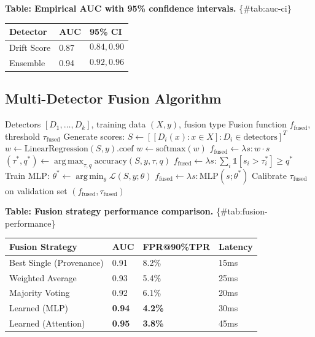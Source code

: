 \documentclass[
]{article}
\newcounter{none} %
\DeclareMathOperator*{\argmax}{arg\,max}
\DeclareMathOperator*{\argmin}{arg\,min}
\begin{document}
\textbf{Table: Empirical AUC with 95\% confidence intervals.}
\{\#tab:auc-ci\}

{\def\LTcaptype{none} %
\begin{longtable}[]{@{}lll@{}}
\toprule\noalign{}
Detector & AUC & 95\% CI \\
\midrule\noalign{}
\endhead
\bottomrule\noalign{}
\endlastfoot
Drift Score & 0.87 & \[0.84, 0.90\] \\
Ensemble & 0.94 & \[0.92, 0.96\] \\
\end{longtable}
}

\subsection{Multi-Detector Fusion
Algorithm}\label{multi-detector-fusion-algorithm}

\begin{algorithm}
\caption{Multi-Detector Fusion}
\label{alg:fusion}
\begin{algorithmic}[1]
\Require Detectors $[D_1, \ldots, D_k]$, training data $(X, y)$, fusion type
\Ensure Fusion function $f_{\text{fused}}$, threshold $\tau_{\text{fused}}$
\State Generate scores: $S \gets [[D_i(x) : x \in X] : D_i \in \text{detectors}]^T$
    \State $w \gets \text{LinearRegression}(S, y).\text{coef}$
    \State $w \gets \text{softmax}(w)$
    \State $f_{\text{fused}} \gets \lambda s: w \cdot s$
    \State $(\tau^*, q^*) \gets \argmax_{\tau,q} \text{accuracy}(S, y, \tau, q)$
    \State $f_{\text{fused}} \gets \lambda s: \sum_i \mathbb{1}[s_i > \tau_i^*] \geq q^*$
    \State Train MLP: $\theta^* \gets \argmin_\theta \mathcal{L}(S, y; \theta)$
    \State $f_{\text{fused}} \gets \lambda s: \text{MLP}(s; \theta^*)$
\EndIf
\State Calibrate $\tau_{\text{fused}}$ on validation set
\State \Return $(f_{\text{fused}}, \tau_{\text{fused}})$
\end{algorithmic}
\end{algorithm}

\textbf{Table: Fusion strategy performance comparison.}
\{\#tab:fusion-performance\}

{\def\LTcaptype{none} %
\begin{longtable}[]{@{}llll@{}}
\toprule\noalign{}
Fusion Strategy & AUC & FPR@90\%TPR & Latency \\
\midrule\noalign{}
\endhead
\bottomrule\noalign{}
\endlastfoot
Best Single (Provenance) & 0.91 & 8.2\% & 15ms \\
Weighted Average & 0.93 & 5.4\% & 25ms \\
Majority Voting & 0.92 & 6.1\% & 20ms \\
Learned (MLP) & \textbf{0.94} & \textbf{4.2\%} & 30ms \\
Learned (Attention) & \textbf{0.95} & \textbf{3.8\%} & 45ms \\
\end{longtable}
}
\end{document}
